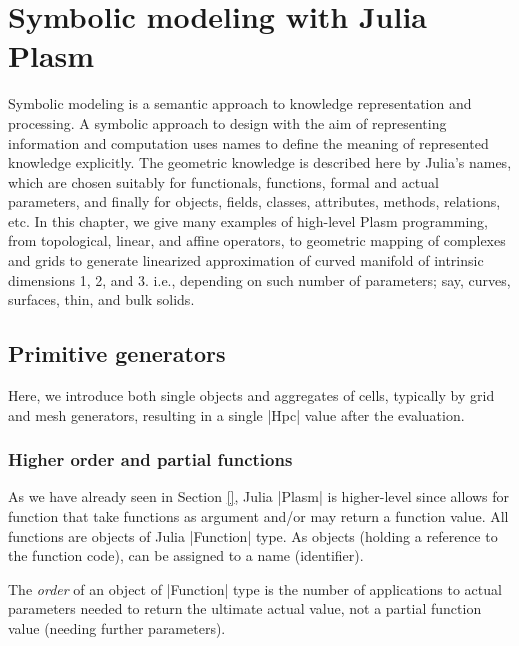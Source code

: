 
\chapter{Symbolic modeling with Julia Plasm}
\label{chapt:5}

Symbolic modeling is a semantic approach to knowledge representation and processing. A  symbolic approach to design with the aim of representing information and computation uses names to define the meaning of represented knowledge explicitly. The geometric knowledge is described here by Julia's names, which are chosen suitably for functionals, functions, formal and actual parameters, and finally for objects, fields, classes, attributes, methods, relations, etc. In this chapter, we give many examples of high-level Plasm programming, from topological, linear, and affine operators, to geometric mapping of complexes and grids to generate linearized approximation of curved manifold of intrinsic dimensions 1, 2, and 3. i.e., depending on such number of parameters; say, curves, surfaces, thin, and bulk solids.



\section{ Primitive generators}\label{sect:5-1}

Here, we introduce both single objects and aggregates of cells, typically by grid and mesh generators, resulting in a single |Hpc| value after the evaluation.


\subsection*{Higher order and partial functions}\label{sect:5-1-0}

As we have already seen in Section \ref{}, Julia |Plasm| is higher-level since allows for function that take functions as argument and/or may return a function value.  All functions are objects of Julia |Function| type. As objects (holding a reference to the function code), can be assigned to a name (identifier).

\begin{definition} The \emph{order} of an object of |Function| type is the number of applications to actual parameters needed to return the ultimate actual value,  not a partial function value (needing further parameters).
\end{definition}

